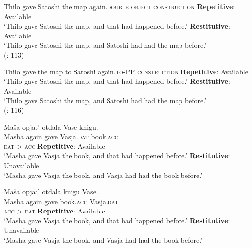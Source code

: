\documentclass[output=paper]{langscibook}
\begin{document}
 \ea\label{ex:bondarenko:3}{Thilo gave Satoshi the map again.}\hfill\textsc{double object construction}
\ea \textbf{Repetitive}: Available\\`Thilo gave Satoshi the map, and that had happened before.'
\ex \textbf{Restitutive}: Available\\`Thilo gave Satoshi the map, and Satoshi had had the map before.'\\
\hfill(\citealt{Beck-Johnson2004}: 113)
\z
\z

 \ea\label{ex:bondarenko:4}{Thilo gave the map to Satoshi again.}\hfill\textsc{to-PP construction}
\ea \textbf{Repetitive}: Available\\`Thilo gave Satoshi the map, and that had happened before.'
\ex \textbf{Restitutive}: Available\\`Thilo gave Satoshi the map, and Satoshi had had the map  before.'\\
\hfill (\citealt{Beck-Johnson2004}: 116)
\z
\z

 \ea\label{ex:bondarenko:5}
\gll Maša opjat’ otdala Vase knigu.\\
     Masha again gave Vasja.\textsc{dat} book.\textsc{acc}\\\hfill\textsc{dat} > \textsc{acc}
\ea \textbf{Repetitive}: Available\\`Masha gave Vasja the book, and that had happened before.'
\ex \textbf{Restitutive}: Unavailable\\`Masha gave Vasja the book, and Vasja had had the book   before.'
\z
\z

 \ea\label{ex:bondarenko:6}
\gll Maša opjat’ otdala knigu Vase.\\
     Masha again gave book.\textsc{acc} Vasja.\textsc{dat}\\\hfill\textsc{acc} > \textsc{dat}
\ea \textbf{Repetitive}: Available\\`Masha gave Vasja the book, and that had happened before.'
\ex \textbf{Restitutive}: Unavailable\\`Masha gave Vasja the book, and Vasja had had the book   before.'
\z
\z
\end{document}
